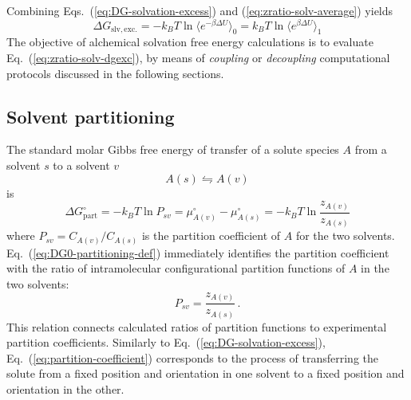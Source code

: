 \documentclass[9pt,bestpractices]{livecoms}
\begin{document}
Combining Eqs.~(\ref{eq:DG-solvation-excess}) and (\ref{eq:zratio-solv-average}) yields\cite{widom1982potential} 
\begin{equation}
  \Delta G_{\mathrm{slv, exc.}} = - k_B T \ln \langle e^{-\beta \Delta U} \rangle_0 = k_B T \ln \langle e^{\beta \Delta U} \rangle_1
  \label{eq:zratio-solv-dgexc}
\end{equation}
The objective of alchemical solvation free energy calculations is to evaluate Eq.~(\ref{eq:zratio-solv-dgexc}), by means of \emph{coupling} or \emph{decoupling} computational protocols discussed in the following sections.

\subsection{Solvent partitioning}\label{sec:theory-partitioning}

The standard molar Gibbs free energy of transfer of a solute species $A$ from a  solvent $s$ to a solvent $v$
\begin{equation}
A(s)  \leftrightharpoons A(v)
\end{equation}
is
\begin{equation}
  \Delta G^\circ_{\mathrm{part}} = -k_B T \ln P_{sv} = \mu^\circ_{A(v)}  - \mu^\circ_{A(s)} = -k_B T \ln \frac{z_{A(v)}}{z_{A(s)}}
  \label{eq:DG0-partitioning-def}
\end{equation}
where $P_{sv} = C_{A(v)}/C_{A(s)}$ is the partition coefficient of $A$ for the two solvents.~\cite{rustenburg2016measuring} Eq.~(\ref{eq:DG0-partitioning-def}) 
immediately identifies the partition coefficient with the ratio of intramolecular configurational partition functions of $A$ in the two solvents:
\begin{equation}
  P_{sv} = \frac{z_{A(v)}}{z_{A(s)}} \, .
  \label{eq:partition-coefficient}
\end{equation}
This relation connects calculated ratios of partition functions to experimental partition coefficients. Similarly to Eq.~(\ref{eq:DG-solvation-excess}), Eq.~(\ref{eq:partition-coefficient}) corresponds to the process of transferring the solute from a fixed position and orientation in one solvent to a fixed position and orientation in the other.
\end{document}
